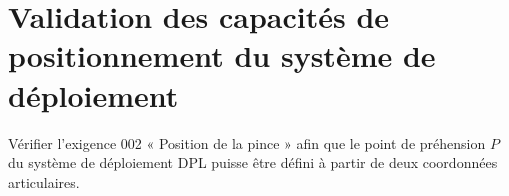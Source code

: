 \section{Validation des capacités de positionnement du système de déploiement}

\begin{obj}
Vérifier l’exigence 002 « Position de la pince » afin que le point de préhension $P$ du 
système de déploiement DPL puisse être défini à partir de deux coordonnées articulaires.
\end{obj}
%
%

